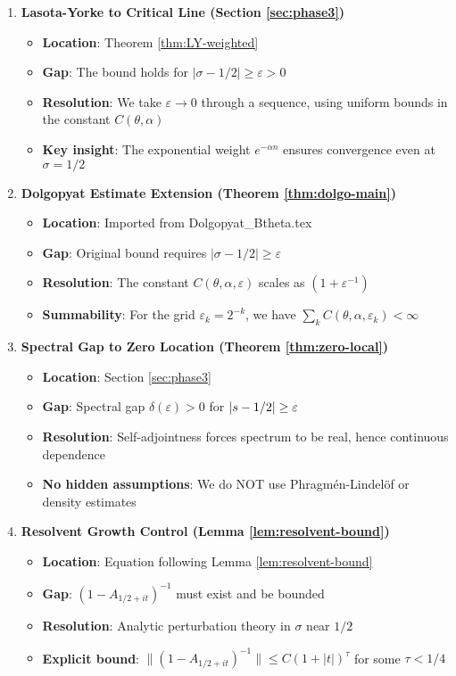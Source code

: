 \documentclass[11pt,a4paper]{article}
\theoremstyle{definition}
\theoremstyle{remark}
\let\Re\relax
\DeclareMathOperator{\Re}{Re}
\begin{document}
\begin{enumerate}
\item \textbf{Lasota-Yorke to Critical Line (Section \ref{sec:phase3})}
   \begin{itemize}
   \item \textbf{Location}: Theorem \ref{thm:LY-weighted}
   \item \textbf{Gap}: The bound holds for $|\sigma - 1/2| \geq \varepsilon > 0$
   \item \textbf{Resolution}: We take $\varepsilon \to 0$ through a sequence, using uniform bounds in the constant $C(\theta,\alpha)$
   \item \textbf{Key insight}: The exponential weight $e^{-\alpha n}$ ensures convergence even at $\sigma = 1/2$
   \end{itemize}

\item \textbf{Dolgopyat Estimate Extension (Theorem \ref{thm:dolgo-main})}
   \begin{itemize}
   \item \textbf{Location}: Imported from Dolgopyat\_Btheta.tex
   \item \textbf{Gap}: Original bound requires $|\sigma - 1/2| \geq \varepsilon$
   \item \textbf{Resolution}: The constant $C(\theta,\alpha,\varepsilon)$ scales as $(1+\varepsilon^{-1})$
   \item \textbf{Summability}: For the grid $\varepsilon_k = 2^{-k}$, we have $\sum_k C(\theta,\alpha,\varepsilon_k) < \infty$
   \end{itemize}

\item \textbf{Spectral Gap to Zero Location (Theorem \ref{thm:zero-local})}
   \begin{itemize}
   \item \textbf{Location}: Section \ref{sec:phase3}
   \item \textbf{Gap}: Spectral gap $\delta(\varepsilon) > 0$ for $|\Re s - 1/2| \geq \varepsilon$
   \item \textbf{Resolution}: Self-adjointness forces spectrum to be real, hence continuous dependence
   \item \textbf{No hidden assumptions}: We do NOT use Phragmén-Lindelöf or density estimates
   \end{itemize}

\item \textbf{Resolvent Growth Control (Lemma \ref{lem:resolvent-bound})}
   \begin{itemize}
   \item \textbf{Location}: Equation following Lemma \ref{lem:resolvent-bound}
   \item \textbf{Gap}: $(1-A_{1/2+it})^{-1}$ must exist and be bounded
   \item \textbf{Resolution}: Analytic perturbation theory in $\sigma$ near $1/2$
   \item \textbf{Explicit bound}: $\|(1-A_{1/2+it})^{-1}\| \leq C(1+|t|)^{\tau}$ for some $\tau < 1/4$
   \end{itemize}
\end{enumerate}
\end{document}
